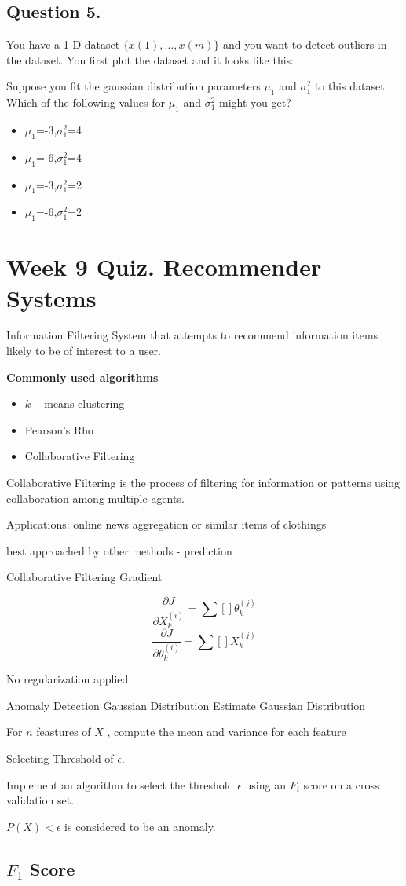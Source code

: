 \documentclass[11pt]{article} %
\begin{document}
\subsection*{Question 5. }
You have a 1-D dataset $\{x(1),\ldots,x(m)\}$ and you want to detect outliers in the dataset. You first plot the dataset and it looks like this:


Suppose you fit the gaussian distribution parameters $\mu_1$ and $\sigma^2_1$ to this dataset. Which of the following values for $\mu_1$ and $\sigma^2_1$ might you get?
\begin{itemize}
	\item $\mu_1$=-3,$\sigma^2_1$=4
	\item 
	$\mu_1$=-6,$\sigma^2_1$=4
	\item
	$\mu_1$=-3,$\sigma^2_1$=2
	\item 
	$\mu_1$=-6,$\sigma^2_1$=2
\end{itemize}




\section{Week 9 Quiz. Recommender Systems}

Information Filtering System that attempts to recommend information items likely
to be of interest to a user.

\textbf{Commonly used algorithms}
\begin{itemize}
	\item $k-$means clustering
	\item Pearson's Rho
	\item Collaborative Filtering
\end{itemize}

Collaborative Filtering is the process of filtering for information or patterns using collaboration among multiple
agents.

Applications: online news aggregation or similar items of clothings

best approached by other methods - prediction

Collaborative Filtering Gradient

\[ \frac{\partial J}{\partial X^{(i)}_k}  = \sum [  ] \theta^{(j)}_k \]
\[ \frac{\partial J}{\partial \theta^{(i)}_k}  = \sum [  ] X^{(j)}_k \]

No regularization applied

Anomaly Detection
Gaussian Distribution
Estimate Gaussian Distribution

For $n$ feastures of $X$ , compute the mean and variance for each feature

Selecting Threshold of $\epsilon$.

Implement an algorithm to select the threshold $\epsilon$ using an $F_i$ score on a 
cross validation set.

$P(X) < \epsilon$ is considered to be an anomaly.

\subsection{$F_1$ Score}
\end{document}
